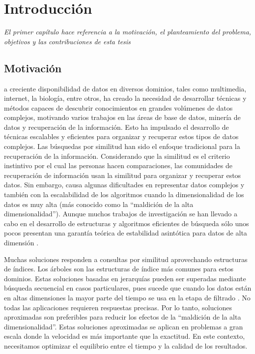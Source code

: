 \let\textcircled=\pgftextcircled
\chapter{Introducción} {\textit{El primer capítulo hace referencia a la motivación, el planteamiento del problema, objetivos y las contribuciones de esta tesis}}
\label{chap:intro}

\section{Motivación}

a creciente disponibilidad de datos en diversos dominios, tales  como multimedia, internet, la biología, entre  otros,  ha creado  la necesidad  de desarrollar  técnicas y métodos capaces de descubrir  conocimientos  en grandes volúmenes de datos complejos, motivando  varios  trabajos en las áreas  de base  de datos,  minería de datos  y recuperación  de la información. Esto ha impulsado el desarrollo de técnicas escalables y eficientes para organizar y recuperar estos tipos de datos complejos. Las búsquedas por similitud han sido el enfoque tradicional para la recuperación de la información. Considerando que la similitud es el criterio instintivo por el cual las personas hacen comparaciones, las comunidades de recuperación de información usan la similitud para organizar y recuperar estos datos.    Sin embargo, causa algunas dificultades en representar datos complejos y también con la escalabilidad de los algoritmos cuando la dimensionalidad de los datos es muy alta (más conocido como la ``maldición de la alta dimensionalidad''). Aunque muchos trabajos de investigación se han llevado a cabo en el desarrollo de estructuras y algoritmos eficientes de búsqueda sólo unos pocos presentan una garantía teórica de estabilidad asintótica para datos de alta dimensión \cite{5459466,CiteULike:7399806}.

Muchas soluciones responden a consultas por similitud aprovechando estructuras de índices. Los árboles son las estructuras de índice más comunes para estos dominios. Estas soluciones basadas en jerarquías pueden ser superadas mediante búsqueda secuencial en casos particulares, pues sucede que cuando los datos están en altas  dimensiones  la mayor parte del tiempo se usa en la etapa de filtrado  \cite{WhatsWrong}. No todas las aplicaciones requieren respuestas precisas. Por lo tanto,  soluciones aproximadas son preferibles para reducir los efectos de la ``maldición de la alta dimensionalidad''. Estas soluciones aproximadas se aplican en problemas a gran escala donde la velocidad es más importante que la exactitud. En este contexto, necesitamos optimizar el equilibrio entre el tiempo y la calidad de los resultados.

